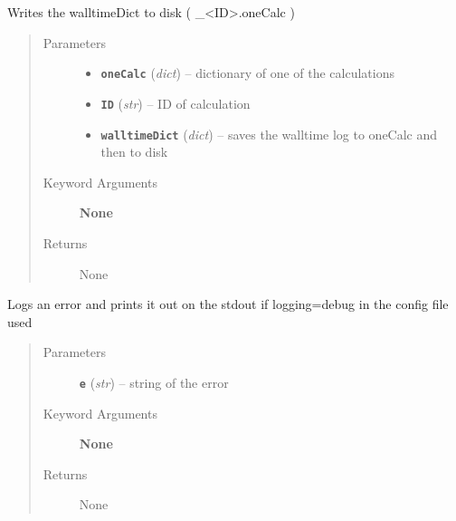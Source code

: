 \documentclass[letterpaper,10pt,english]{sphinxmanual}
\begin{document}
\begin{fulllineitems}
\label{run:run.__writeWalltimeLog}
Writes the walltimeDict to disk ( \_\textless{}ID\textgreater{}.oneCalc )
\begin{quote}\begin{description}
\item[{Parameters}] \leavevmode\begin{itemize}
\item {} 
\textbf{\texttt{oneCalc}} (\emph{dict}) -- dictionary of one of the calculations

\item {} 
\textbf{\texttt{ID}} (\emph{str}) -- ID of calculation

\item {} 
\textbf{\texttt{walltimeDict}} (\emph{dict}) -- saves the walltime log to oneCalc and then to disk

\end{itemize}

\item[{Keyword Arguments}] \leavevmode
\textbf{None}

\item[{Returns}] \leavevmode
None

\end{description}\end{quote}

\end{fulllineitems}


\begin{fulllineitems}
\label{run:run._fancy_error_log}
Logs an error and prints it out on the stdout if logging=debug in the config file used
\begin{quote}\begin{description}
\item[{Parameters}] \leavevmode
\textbf{\texttt{e}} (\emph{str}) -- string of the error

\item[{Keyword Arguments}] \leavevmode
\textbf{None}

\item[{Returns}] \leavevmode
None

\end{description}\end{quote}

\end{fulllineitems}
\end{document}
